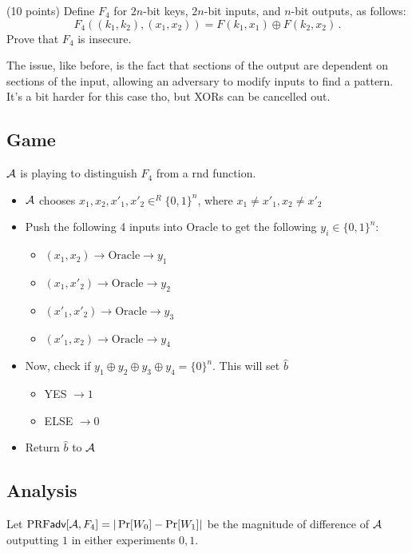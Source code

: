 \documentclass[12pt]{article}
\theoremstyle{plain}
\theoremstyle{definition}
\begin{document}
\begin{problem}
\begin{ppart} (10 points)
Define $F_4$  for $2n$-bit keys, $2n$-bit inputs, and $n$-bit outputs, as follows: 
\[
F_4((k_1, k_2), (x_1, x_2))=F(k_1, x_1)\oplus F(k_2, x_2)\,.
\]
Prove that $F_4$ is insecure.
\end{ppart}

\begin{solution}
The issue, like before, is the fact that sections of the output are dependent on sections of the input, allowing an adversary to modify inputs to find a pattern. It's a bit harder for this case tho, but XORs can be cancelled out.

\subsection*{Game}
$\mathcal{A}$ is playing to distinguish $F_4$ from a rnd function.
\begin{itemize}
  \item $\mathcal{A}$ chooses $x_1, x_2, x'_1, x'_2 \in^R \{0, 1\}^n$, where $x_1 \neq x'_1, x_2 \neq x'_2$
  \item Push the following 4 inputs into $\text{Oracle}$ to get the following $y_i \in \{0, 1\}^n$:
  \begin{itemize}
    \item $(x_1, x_2) \to \text{Oracle} \to y_1$
    \item $(x_1, x'_2) \to \text{Oracle} \to y_2$
    \item $(x'_1, x'_2) \to \text{Oracle} \to y_3$
    \item $(x'_1, x_2) \to \text{Oracle} \to y_4$
  \end{itemize}
  \item Now, check if $y_1 \oplus y_2 \oplus y_3 \oplus y_4 = \{0\}^n$. This will set $\hat{b}$
  \begin{itemize}
    \item YES $\to 1$
    \item ELSE $\to 0$
  \end{itemize}
  \item Return $\hat{b}$ to $\mathcal{A}$
\end{itemize}

\subsection*{Analysis}
Let $\textrm{PRF}\textsf{adv}[\mathcal{A}, F_4] = |\Pr[W_0] - \Pr[W_1]|$ be the magnitude of difference of $\mathcal{A}$ outputting $1$ in either experiments $0, 1$.


\end{solution}
\end{problem}
\end{document}
